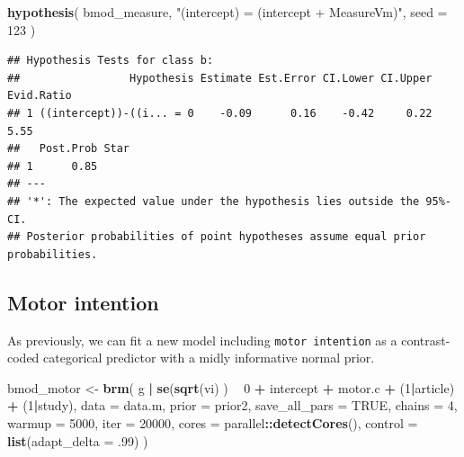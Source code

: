 \documentclass[floatsintext,doc]{apa6}
\newenvironment{Shaded}{\begin{snugshade}}{\end{snugshade}}
\newcommand{\DataTypeTok}[1]{\textcolor[rgb]{0.13,0.29,0.53}{#1}}
\newcommand{\DecValTok}[1]{\textcolor[rgb]{0.00,0.00,0.81}{#1}}
\newcommand{\FloatTok}[1]{\textcolor[rgb]{0.00,0.00,0.81}{#1}}
\newcommand{\KeywordTok}[1]{\textcolor[rgb]{0.13,0.29,0.53}{\textbf{#1}}}
\newcommand{\NormalTok}[1]{#1}
\newcommand{\OperatorTok}[1]{\textcolor[rgb]{0.81,0.36,0.00}{\textbf{#1}}}
\newcommand{\OtherTok}[1]{\textcolor[rgb]{0.56,0.35,0.01}{#1}}
\newcommand{\StringTok}[1]{\textcolor[rgb]{0.31,0.60,0.02}{#1}}
\begin{document}
\begin{Shaded}
\begin{Highlighting}[]
\KeywordTok{hypothesis}\NormalTok{(}
\NormalTok{    bmod_measure, }\StringTok{"(intercept) = (intercept + MeasureVm)"}\NormalTok{,}
    \DataTypeTok{seed =} \DecValTok{123}
\NormalTok{    )}
\end{Highlighting}
\end{Shaded}

\begin{verbatim}
## Hypothesis Tests for class b:
##                 Hypothesis Estimate Est.Error CI.Lower CI.Upper Evid.Ratio
## 1 ((intercept))-((i... = 0    -0.09      0.16    -0.42     0.22       5.55
##   Post.Prob Star
## 1      0.85     
## ---
## '*': The expected value under the hypothesis lies outside the 95%-CI.
## Posterior probabilities of point hypotheses assume equal prior probabilities.
\end{verbatim}

\hypertarget{motor-intention}{%
\subsection{Motor intention}\label{motor-intention}}

As previously, we can fit a new model including \texttt{motor\ intention} as a contrast-coded categorical predictor with a midly informative normal prior.

\begin{Shaded}
\begin{Highlighting}[]
\NormalTok{bmod_motor <-}\StringTok{ }\KeywordTok{brm}\NormalTok{(}
\NormalTok{    g }\OperatorTok{|}\StringTok{ }\KeywordTok{se}\NormalTok{(}\KeywordTok{sqrt}\NormalTok{(vi) ) }\OperatorTok{~}\StringTok{ }\DecValTok{0} \OperatorTok{+}\StringTok{ }\NormalTok{intercept }\OperatorTok{+}\StringTok{ }\NormalTok{motor.c }\OperatorTok{+}\StringTok{ }\NormalTok{(}\DecValTok{1}\OperatorTok{|}\NormalTok{article) }\OperatorTok{+}\StringTok{ }\NormalTok{(}\DecValTok{1}\OperatorTok{|}\NormalTok{study),}
    \DataTypeTok{data =}\NormalTok{ data.m,}
    \DataTypeTok{prior =}\NormalTok{ prior2,}
    \DataTypeTok{save_all_pars =} \OtherTok{TRUE}\NormalTok{,}
    \DataTypeTok{chains =} \DecValTok{4}\NormalTok{,}
    \DataTypeTok{warmup =} \DecValTok{5000}\NormalTok{,}
    \DataTypeTok{iter =} \DecValTok{20000}\NormalTok{,}
    \DataTypeTok{cores =}\NormalTok{ parallel}\OperatorTok{::}\KeywordTok{detectCores}\NormalTok{(),}
    \DataTypeTok{control =} \KeywordTok{list}\NormalTok{(}\DataTypeTok{adapt_delta =} \FloatTok{.99}\NormalTok{)}
\NormalTok{    )}
\end{Highlighting}
\end{Shaded}
\end{document}
